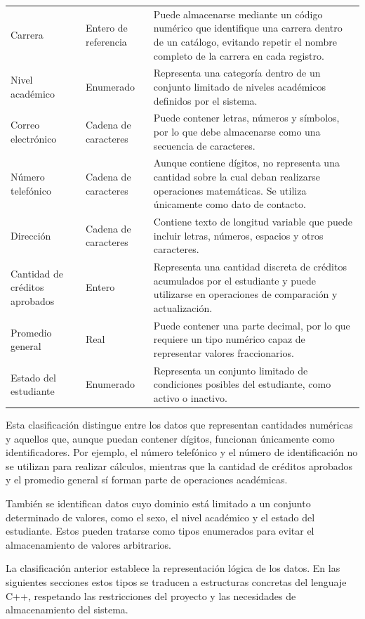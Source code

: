 \begin{longtable}{p{3.8cm} p{3.2cm} p{7cm}}
Carrera &
Entero de referencia &
Puede almacenarse mediante un código numérico que identifique una carrera
dentro de un catálogo, evitando repetir el nombre completo de la carrera
en cada registro. \\

Nivel académico &
Enumerado &
Representa una categoría dentro de un conjunto limitado de niveles
académicos definidos por el sistema. \\

Correo electrónico &
Cadena de caracteres &
Puede contener letras, números y símbolos, por lo que debe almacenarse
como una secuencia de caracteres. \\

Número telefónico &
Cadena de caracteres &
Aunque contiene dígitos, no representa una cantidad sobre la cual deban
realizarse operaciones matemáticas. Se utiliza únicamente como dato de
contacto. \\

Dirección &
Cadena de caracteres &
Contiene texto de longitud variable que puede incluir letras, números,
espacios y otros caracteres. \\

Cantidad de créditos aprobados &
Entero &
Representa una cantidad discreta de créditos acumulados por el estudiante
y puede utilizarse en operaciones de comparación y actualización. \\

Promedio general &
Real &
Puede contener una parte decimal, por lo que requiere un tipo numérico
capaz de representar valores fraccionarios. \\

Estado del estudiante &
Enumerado &
Representa un conjunto limitado de condiciones posibles del estudiante,
como activo o inactivo. \\

\bottomrule
\end{longtable}

Esta clasificación distingue entre los datos que representan cantidades
numéricas y aquellos que, aunque puedan contener dígitos, funcionan
únicamente como identificadores. Por ejemplo, el número telefónico y el
número de identificación no se utilizan para realizar cálculos, mientras
que la cantidad de créditos aprobados y el promedio general sí forman
parte de operaciones académicas.

También se identifican datos cuyo dominio está limitado a un conjunto
determinado de valores, como el sexo, el nivel académico y el estado del
estudiante. Estos pueden tratarse como tipos enumerados para evitar el
almacenamiento de valores arbitrarios.

La clasificación anterior establece la representación lógica de los
datos. En las siguientes secciones estos tipos se traducen a estructuras
concretas del lenguaje C++, respetando las restricciones del proyecto y
las necesidades de almacenamiento del sistema.